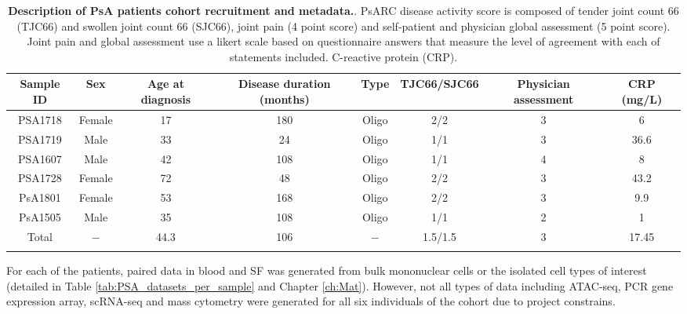 %
\begin{landscape}
\begin{center}
\begin{longtable}[ht]{c c c c c c c c}
\caption[Description of PsA patients cohort recruitment and metadata.]{\textbf{Description of PsA patients cohort recruitment and metadata.}. PsARC disease activity score is composed of tender joint count 66 (TJC66) and swollen joint count 66 (SJC66), joint pain (4 point score) and self-patient and physician global assessment (5 point score). Joint pain and global assessment use a likert scale based on questionnaire answers that measure the level of agreement with each of statements included. C-reactive protein (CRP).}
\label{tab:PSA_cohort_metadata} \\
\toprule
\textbf{ Sample ID} & \textbf{Sex} & \textbf{Age at diagnosis} & \textbf{Disease duration (months)} & \textbf{Type} &\textbf{TJC66/SJC66}  & \textbf{Physician assessment} & \textbf{CRP (mg/L)} \\
\midrule
\midrule
PSA1718 & Female & 17 & 180 & Oligo  & 2/2 & 3 & 6 \\
PSA1719	& Male &	33 & 24	 & Oligo &	1/1 &	3 & 36.6 \\           
PSA1607 &	Male & 42 & 108 &	Oligo &	1/1	& 4 & 8 \\
PSA1728	& Female & 72	& 48 & Oligo & 2/2 & 3 & 43.2 \\
PsA1801	& Female & 53 & 168 & Oligo & 2/2 &	3 & 9.9 \\
PsA1505 & Male & 35 &	108 & Oligo & 1/1 & 2 & 1 \\	
Total		& $-$	&	44.3 & 106 & $-$ & 1.5/1.5 & 3 & 17.45 \\																			
\bottomrule
\medskip
\end{longtable}
\end{center}
\end{landscape}


For each of the patients, paired data in blood and SF was generated from bulk mononuclear cells or the isolated cell types of interest (detailed in Table \ref{tab:PSA_datasets_per_sample} and Chapter \ref{ch:Mat}). However, not all types of data including ATAC-seq, PCR gene expression array, scRNA-seq and mass cytometry were generated for all six individuals of the cohort due to project constrains. 

